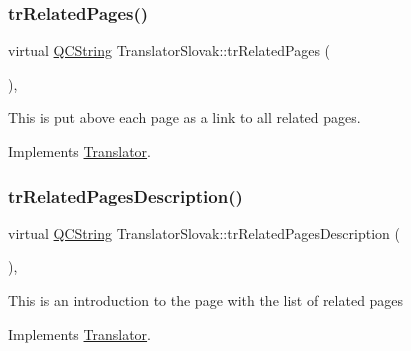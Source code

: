 \mbox{\label{class_translator_slovak_a7cc7b278407b6c219deb979d0cefa44f}} 
\subsubsection{\texorpdfstring{trRelatedPages()}{trRelatedPages()}}
{\footnotesize\ttfamily virtual \mbox{\hyperlink{class_q_c_string}{Q\+C\+String}} Translator\+Slovak\+::tr\+Related\+Pages (\begin{DoxyParamCaption}{ }\end{DoxyParamCaption})\hspace{0.3cm}{\ttfamily [inline]}, {\ttfamily [virtual]}}

This is put above each page as a link to all related pages. 

Implements \mbox{\hyperlink{class_translator}{Translator}}.

\mbox{\label{class_translator_slovak_a380862a893b97e1dc836cb210d21c3b1}} 
\subsubsection{\texorpdfstring{trRelatedPagesDescription()}{trRelatedPagesDescription()}}
{\footnotesize\ttfamily virtual \mbox{\hyperlink{class_q_c_string}{Q\+C\+String}} Translator\+Slovak\+::tr\+Related\+Pages\+Description (\begin{DoxyParamCaption}{ }\end{DoxyParamCaption})\hspace{0.3cm}{\ttfamily [inline]}, {\ttfamily [virtual]}}

This is an introduction to the page with the list of related pages 

Implements \mbox{\hyperlink{class_translator}{Translator}}.

\mbox{\label{class_translator_slovak_afb74f2844f415258b1c28c6b79d0f4c2}} 
